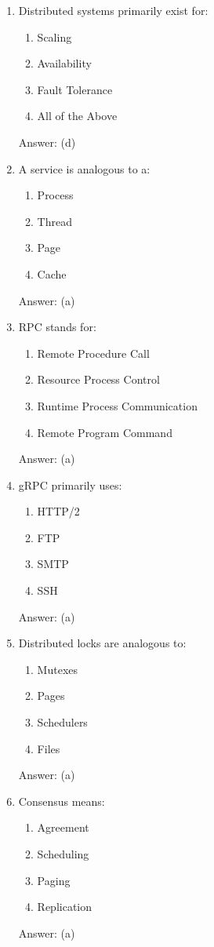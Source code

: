 \begin{enumerate}

\item Distributed systems primarily exist for:
\begin{enumerate}[label=(\alph*)]
\item Scaling
\item Availability
\item Fault Tolerance
\item All of the Above
\end{enumerate}
Answer: (d)

\item A service is analogous to a:
\begin{enumerate}[label=(\alph*)]
\item Process
\item Thread
\item Page
\item Cache
\end{enumerate}
Answer: (a)

\item RPC stands for:
\begin{enumerate}[label=(\alph*)]
\item Remote Procedure Call
\item Resource Process Control
\item Runtime Process Communication
\item Remote Program Command
\end{enumerate}
Answer: (a)

\item gRPC primarily uses:
\begin{enumerate}[label=(\alph*)]
\item HTTP/2
\item FTP
\item SMTP
\item SSH
\end{enumerate}
Answer: (a)

\item Distributed locks are analogous to:
\begin{enumerate}[label=(\alph*)]
\item Mutexes
\item Pages
\item Schedulers
\item Files
\end{enumerate}
Answer: (a)

\item Consensus means:
\begin{enumerate}[label=(\alph*)]
\item Agreement
\item Scheduling
\item Paging
\item Replication
\end{enumerate}
Answer: (a)


\end{enumerate}
